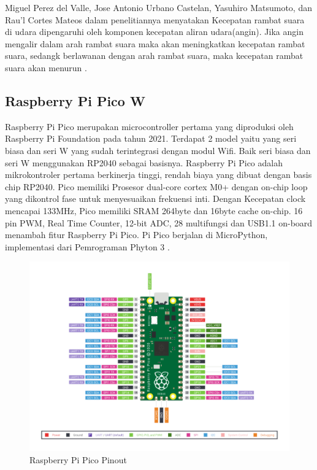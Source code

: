 Miguel Perez del Valle, Jose Antonio Urbano Castelan, Yasuhiro Matsumoto, dan Rau’l Cortes Mateos dalam penelitiannya menyatakan 
Kecepatan rambat suara di udara dipengaruhi oleh komponen kecepatan aliran udara(angin). Jika angin mengalir dalam arah rambat 
suara maka akan meningkatkan kecepatan rambat suara, sedangk berlawanan dengan arah rambat suara, maka 
kecepatan rambat suara akan menurun \parencite{del2007low}.

\subsection{Raspberry Pi Pico W}

Raspberry Pi Pico merupakan microcontroller pertama yang diproduksi oleh Raspberry Pi Foundation pada tahun 2021. Terdapat 2 model
yaitu yang seri biasa dan seri W yang sudah terintegrasi dengan modul Wifi. Baik seri biasa dan seri W menggunakan RP2040 sebagai basisnya.
Raspberry Pi Pico adalah mikrokontroler pertama berkinerja tinggi, rendah biaya
yang dibuat dengan basis chip RP2040. Pico memiliki
Prosesor dual-core cortex M0+ dengan on-chip
loop yang dikontrol fase untuk menyesuaikan frekuensi inti. Dengan
Kecepatan clock mencapai 133MHz, Pico memiliki SRAM 264byte dan 16byte
cache on-chip. 16 pin PWM, Real Time Counter,
12-bit ADC, 28 multifungsi
dan USB1.1 on-board menambah fitur Raspberry Pi
Pico. Pi Pico berjalan di MicroPython, implementasi dari
Pemrograman Phyton 3 \parencite{thothadri2021analysis}.

\begin{figure}[h!]
	\centering
	\includegraphics[width=0.7\linewidth]{"gambar/pico pinout"}
	\caption{Raspberry Pi Pico Pinout \parencite{figPicoPinout}}
	\label{fig:pico-pinout}
\end{figure}
